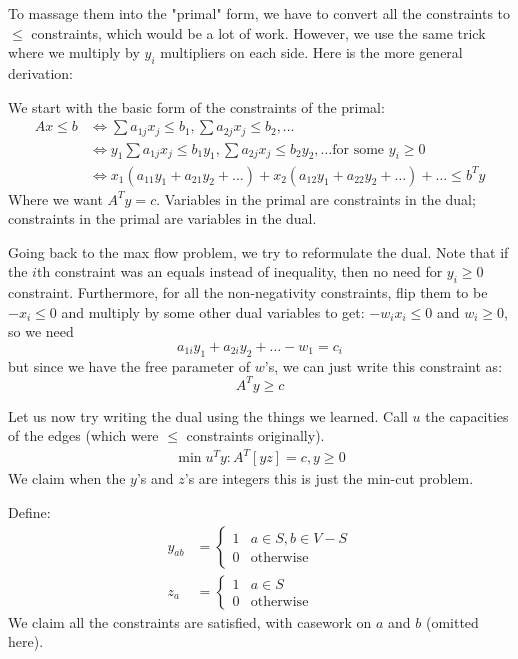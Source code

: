 To massage them into the "primal" form, we have to convert all the constraints to $\leq$ constraints, which would be a lot of work.
However, we use the same trick where we multiply by $y_i$ multipliers on each side. Here is the more general derivation:

We start with the basic form of the constraints of the primal:
\begin{align*}
    Ax \leq b &\iff \sum a_{1j} x_j \leq b_1, \sum a_{2j} x_j \leq b_2, \dots \\
    &\iff y_1 \sum a_{1j} x_j \leq b_1 y_1, \sum a_{2j} x_j \leq b_2 y_2, \dots \text{for some $y_i \geq 0$}\\
    &\iff x_1(a_{11} y_1 + a_{21} y_2 + \dots) + x_2(a_{12}y_1 + a_{22}y_2 + \dots) + \dots \leq b^T y
\end{align*}
Where we want $A^T y = c$. Variables in the primal are constraints in the dual; constraints in the primal are variables in the dual.

Going back to the max flow problem, we try to reformulate the dual. Note that if the $i$th constraint was an equals instead of inequality, then no need for $y_i \geq 0$ constraint.
Furthermore, for all the non-negativity constraints, flip them to be $- x_i \leq 0$ and multiply by some other dual variables to get:
$- w_i x_i \leq 0$ and $w_i \geq 0$, so we need
\[ a_{1i} y_1 + a_{2i} y_2 + \dots - w_1 = c_i \]
but since we have the free parameter of $w$'s, we can just write this constraint as:
\[ A^T y \geq c \]

Let us now try writing the dual using the things we learned. Call $u$ the capacities of the edges (which were $\leq$ constraints originally).
\begin{align*}
    \min u^T y : A^T [y z] = c, y \geq 0
\end{align*}
We claim when the $y$'s and $z$'s are integers this is just the min-cut problem.

Define:
\begin{align*}
    y_{ab} &= \begin{cases}
    1 & a \in S, b \in V - S \\
    0 & \text{otherwise}
    \end{cases} \\
    z_a &= \begin{cases}
        1 & a \in S \\
        0 & \text{otherwise}
    \end{cases}
\end{align*}
We claim all the constraints are satisfied, with casework on $a$ and $b$ (omitted here).

